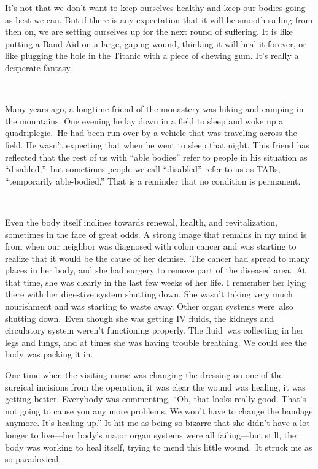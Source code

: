 It's not that we don't want to keep ourselves healthy and keep our bodies going as best we can. But if there is any expectation that it will be smooth sailing from then on, we are setting ourselves up for the next round of suffering. It is like putting a Band-Aid on a large, gaping wound, thinking it will heal it forever, or like plugging the hole in the Titanic with a piece of chewing gum. It's really a desperate fantasy.~~

~

Many years ago, a longtime friend of the monastery was hiking and camping in the mountains. One evening he lay down in a field to sleep and woke up a quadriplegic.~He had been run over by a vehicle that was traveling across the field. He wasn't expecting that when he went to sleep that night. This friend has reflected that the rest of us with ``able bodies'' refer to people in his situation as ``disabled,''~but sometimes people we call ``disabled'' refer to us as TABs, ``temporarily able-bodied.'' That is a reminder that no condition is permanent.

~

Even the body itself inclines towards renewal, health, and revitalization, sometimes in the face of great odds. A strong image that remains in my mind is from when our neighbor was diagnosed with colon cancer and was starting to realize that it would be the cause of her demise.~The cancer had spread to many places in her body, and she had surgery to remove part of the diseased area.~At that time, she was clearly in the last few weeks of her life. I remember her lying there with her digestive system shutting down. She wasn't taking very much nourishment and was starting to waste away. Other organ systems were~also shutting down.~Even though she was getting IV fluids, the kidneys and circulatory system weren't functioning properly. The fluid~was collecting in her legs and lungs, and at times she was having trouble breathing. We could see the body was packing it in.

One time when the visiting nurse was changing the dressing on one of the surgical incisions from the operation, it was clear the wound was healing, it was getting better. Everybody was commenting, ``Oh, that looks really good. That's not going to cause you any more problems. We won't have to change the bandage anymore. It's healing up.'' It hit me as being so bizarre that she didn't have a lot longer to live---her body's major organ systems were all failing---but still, the body was working to heal itself, trying to mend this little wound.~It struck me as so paradoxical.~

